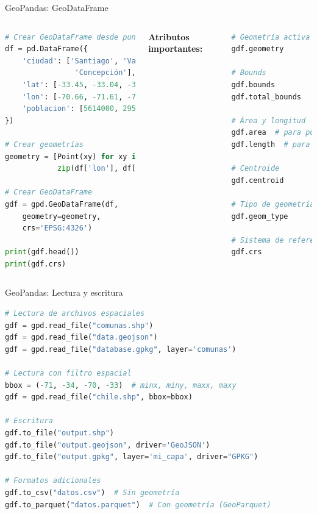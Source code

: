 \documentclass[10pt,aspectratio=169]{beamer}
\begin{document}
\begin{frame}[fragile]{GeoPandas: GeoDataFrame}
    \begin{columns}[T]
        \begin{lstlisting}[language=Python]
# Crear GeoDataFrame desde puntos
df = pd.DataFrame({
    'ciudad': ['Santiago', 'Valparaíso', 
                'Concepción'],
    'lat': [-33.45, -33.04, -36.82],
    'lon': [-70.66, -71.61, -73.04],
    'poblacion': [5614000, 295113, 223574]
})

# Crear geometrías
geometry = [Point(xy) for xy in 
            zip(df['lon'], df['lat'])]

# Crear GeoDataFrame
gdf = gpd.GeoDataFrame(df, 
    geometry=geometry,
    crs='EPSG:4326')

print(gdf.head())
print(gdf.crs)
        \end{lstlisting}
        
        \textbf{Atributos importantes:}
        \begin{lstlisting}[language=Python]
# Geometría activa
gdf.geometry

# Bounds
gdf.bounds
gdf.total_bounds

# Área y longitud
gdf.area  # para polígonos
gdf.length  # para líneas

# Centroide
gdf.centroid

# Tipo de geometría
gdf.geom_type

# Sistema de referencia
gdf.crs
        \end{lstlisting}
    \end{columns}
\end{frame}

\begin{frame}[fragile]{GeoPandas: Lectura y escritura}
    \begin{lstlisting}[language=Python]
# Lectura de archivos espaciales
gdf = gpd.read_file("comunas.shp")
gdf = gpd.read_file("data.geojson")
gdf = gpd.read_file("database.gpkg", layer='comunas')

# Lectura con filtro espacial
bbox = (-71, -34, -70, -33)  # minx, miny, maxx, maxy
gdf = gpd.read_file("chile.shp", bbox=bbox)

# Escritura
gdf.to_file("output.shp")
gdf.to_file("output.geojson", driver='GeoJSON')
gdf.to_file("output.gpkg", layer='mi_capa', driver="GPKG")

# Formatos adicionales
gdf.to_csv("datos.csv")  # Sin geometría
gdf.to_parquet("datos.parquet")  # Con geometría (GeoParquet)
    \end{lstlisting}
\end{frame}
\end{document}
